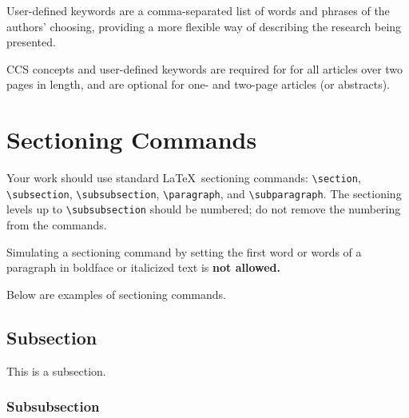 \documentclass[acmlarge]{acmart}
\begin{document}
User-defined keywords are a comma-separated list of words and phrases
of the authors' choosing, providing a more flexible way of describing
the research being presented.

CCS concepts and user-defined keywords are required for for all
articles over two pages in length, and are optional for one- and
two-page articles (or abstracts).

\section{Sectioning Commands}

Your work should use standard \LaTeX\ sectioning commands:
\verb|\section|, \verb|\subsection|, \verb|\subsubsection|,
\verb|\paragraph|, and \verb|\subparagraph|. The sectioning levels up to
\verb|\subsubsection| should be numbered; do not remove the numbering
from the commands.

Simulating a sectioning command by setting the first word or words of
a paragraph in boldface or italicized text is {\bfseries not allowed.}

Below are examples of sectioning commands.

\subsection{Subsection}
\label{sec:subsection}

This is a subsection.

\subsubsection{Subsubsection}
\label{sec:subsubsection}
\end{document}
